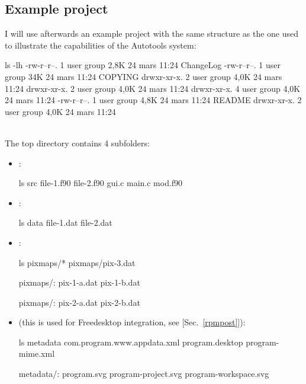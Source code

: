 \subsection{Example project}

I will use afterwards an example project with the same structure as the one used to illustrate the capabilities of the Autotools system: 
{\footnotesize{
\begin{script}
 ls -lh
-rw-r--r--. 1 user group 2,8K 24 mars  11:24 ChangeLog
-rw-r--r--. 1 user group  34K 24 mars  11:24 COPYING
drwxr-xr-x. 2 user group 4,0K 24 mars  11:24 
drwxr-xr-x. 2 user group 4,0K 24 mars  11:24 
drwxr-xr-x. 4 user group 4,0K 24 mars  11:24 
-rw-r--r--. 1 user group 4,8K 24 mars  11:24 README
drwxr-xr-x. 2 user group 4,0K 24 mars  11:24 
\end{script}
}}
\vspace{-0.25cm}
\\
\noindent The top directory contains 4 subfolders:
\begin{itemize}
\item {}:
{\footnotesize{
\begin{scripti}
 ls src
file-1.f90    file-2.f90    gui.c    main.c    mod.f90
\end{scripti}
}}
\vspace{-0.75cm} \item {}:
{\footnotesize{
\begin{scripti}
 ls data
file-1.dat    file-2.dat
\end{scripti}
}}
\vspace{-0.75cm}
\item {}:
{\footnotesize{
\begin{scripti}
 ls pixmaps/*
pixmaps/pix-3.dat

pixmaps/:
pix-1-a.dat    pix-1-b.dat

pixmaps/:
pix-2-a.dat    pix-2-b.dat
\end{scripti}
}}
\vspace{-0.75cm} \item {} (this is used for Freedesktop integration, see [Sec.~\ref{rpmpost}]):
{\footnotesize{
\begin{scripti}
 ls metadata
com.program.www.appdata.xml    program.desktop    program-mime.xml

metadata/:
program.svg    program-project.svg    program-workspace.svg
\end{scripti}
}}
\end{itemize}

